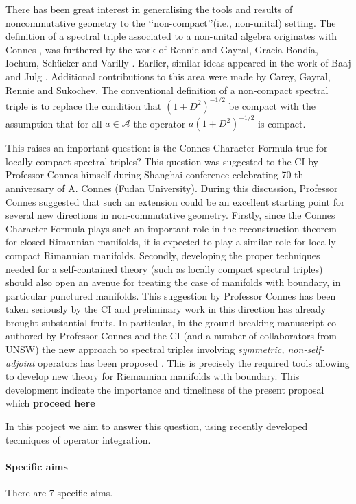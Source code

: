 \documentclass{article}
\begin{document}
There has been great interest in generalising the tools and results of noncommutative geometry to the \lq\lq non-compact\rq\rq (i.e., non-unital) setting. The definition of a spectral triple associated to a non-unital algebra originates with Connes \cite{Connes-reality}, was furthered by the work of Rennie \cite{Rennie}     and Gayral, Gracia-Bond\'ia, Iochum, Sch\"ucker and Varilly \cite{gayral-moyal}. Earlier, similar ideas appeared in the work of Baaj and Julg \cite{Baaj-Julg}. Additional contributions to this area were made by Carey, Gayral, Rennie and Sukochev\cite{CGRS}. The conventional definition  of a non-compact spectral triple is to replace the condition that $(1+D^2)^{-1/2}$ be compact with the assumption that for all $a \in \mathcal{A}$ the operator $a(1+D^2)^{-1/2}$ is compact.
    
This raises an important question: is the Connes Character Formula true for locally compact spectral triples? This question was suggested to the CI by Professor Connes himself during Shanghai conference celebrating 70-th anniversary of A. Connes (Fudan University). During this discussion, Professor Connes suggested that such an extension could be an excellent starting point for several new directions in non-commutative geometry. Firstly, since the Connes Character Formula plays such an important role in the reconstruction theorem for closed Rimannian manifolds, it is expected to play a similar role for locally compact Rimannian manifolds. Secondly, developing the proper techniques needed for a self-contained theory (such as locally compact spectral triples) should also open an avenue for treating the case of manifolds with boundary, in particular punctured manifolds. This suggestion by Professor Connes has been taken seriously by the CI and preliminary work in this direction has already brought substantial fruits. In particular, in the ground-breaking manuscript co-authored by Professor Connes and the CI (and a number of collaborators from UNSW) the new approach to spectral triples involving {\it symmetric, non-self-adjoint} operators has been proposed \cite{Connes_team_symmetric}. This is precisely the required tools allowing to develop new theory for Riemannian manifolds with boundary. This development indicate the importance and timeliness of the present proposal which {\bf proceed here}
    
In this project we aim to answer this question, using recently developed techniques of operator integration.
    

\paragraph*{Specific aims} There are 7 specific aims.
\end{document}

